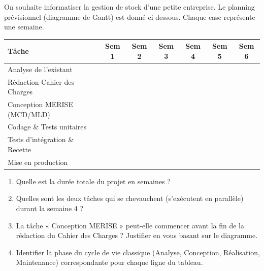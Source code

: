 \documentclass[11pt]{article}
\begin{document}
\begin{exercice}
On souhaite informatiser la gestion de stock d'une petite entreprise. Le planning prévisionnel (diagramme de Gantt) est donné ci-dessous. Chaque case représente une semaine.

\begin{center}
\begin{tabular}{|l|c|c|c|c|c|c|}
\hline
\textbf{Tâche} & \textbf{Sem 1} & \textbf{Sem 2} & \textbf{Sem 3} & \textbf{Sem 4} & \textbf{Sem 5} & \textbf{Sem 6} \\
\hline
Analyse de l'existant & \cellcolor{gray!30} & \cellcolor{gray!30} &  &  &  &  \\
\hline
Rédaction Cahier des Charges &  & \cellcolor{gray!30} & \cellcolor{gray!30} &  &  &  \\
\hline
Conception MERISE (MCD/MLD) &  &  & \cellcolor{gray!30} & \cellcolor{gray!30} &  &  \\
\hline
Codage \& Tests unitaires &  &  &  & \cellcolor{gray!30} & \cellcolor{gray!30} &  \\
\hline
Tests d'intégration \& Recette &  &  &  &  & \cellcolor{gray!30} & \cellcolor{gray!30} \\
\hline
Mise en production &  &  &  &  &  & \cellcolor{gray!30} \\
\hline
\end{tabular}
\end{center}

\begin{enumerate}
    \item Quelle est la durée totale du projet en semaines ?
    \item Quelles sont les deux tâches qui se chevauchent (s'exécutent en parallèle) durant la semaine 4 ?
    \item La tâche « Conception MERISE » peut-elle commencer avant la fin de la rédaction du Cahier des Charges ? Justifier en vous basant sur le diagramme.
    \item Identifier la phase du cycle de vie classique (Analyse, Conception, Réalisation, Maintenance) correspondante pour chaque ligne du tableau.
\end{enumerate}
\end{exercice}
\end{document}

